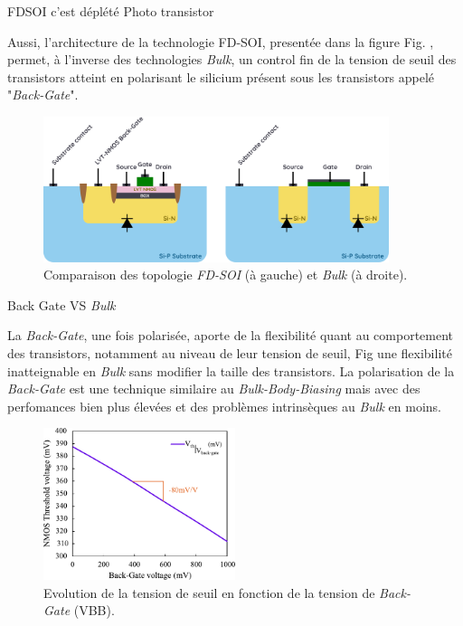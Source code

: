 \begin{metsUneSource}
FDSOI c’est déplété
Photo transistor
\end{metsUneSource}



Aussi, l’architecture de la technologie FD-SOI, presentée dans la figure Fig.%
, permet, à l’inverse des technologies \textit{Bulk}, un control fin de la tension de seuil des transistors atteint en polarisant le silicium présent sous les transistors appelé "\textit{Back-Gate}".

\begin{figure}[H]
  \centering
  \includegraphics[width=0.9\textwidth]{figures/SOIvsBULK.pdf}
  \caption{Comparaison des topologie \textit{FD-SOI} (à gauche) et \textit{Bulk} (à droite).}
  \label{fig:SOIvsBULK}
\end{figure}
\begin{metsUneSource}
Back Gate VS \textit{Bulk}
\end{metsUneSource}

La \textit{Back-Gate}, une fois polarisée, aporte de la flexibilité quant au comportement des transistors, notamment au niveau de leur tension de seuil, Fig %
 une flexibilité inatteignable en \textit{Bulk} sans modifier la taille des transistors. La polarisation de la \textit{Back-Gate} est une technique similaire au \textit{Bulk-Body-Biasing} mais avec des perfomances bien plus élevées et des problèmes intrinsèques au \textit{Bulk} en moins.

\begin{figure}[H]
  \centering
  \includegraphics[width=0.5\textwidth]{figures/Vt(Vbb).pdf}
  \caption{Evolution de la tension de seuil en fonction de la tension de \textit{Back-Gate} (VBB).}
  \label{fig:VTvsVBB}
\end{figure}

